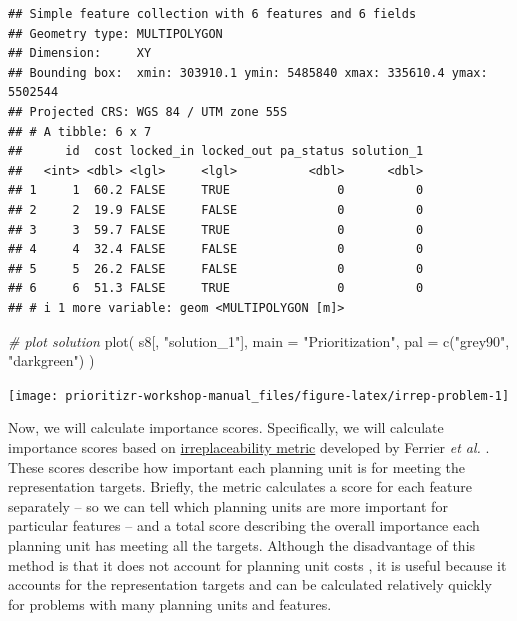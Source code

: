 \documentclass[
  12pt,
]{book}
\newenvironment{Shaded}{\begin{snugshade}}{\end{snugshade}}
\newcommand{\AttributeTok}[1]{\textcolor[rgb]{0.77,0.63,0.00}{#1}}
\newcommand{\CommentTok}[1]{\textcolor[rgb]{0.56,0.35,0.01}{\textit{#1}}}
\newcommand{\FunctionTok}[1]{\textcolor[rgb]{0.00,0.00,0.00}{#1}}
\newcommand{\NormalTok}[1]{#1}
\newcommand{\StringTok}[1]{\textcolor[rgb]{0.31,0.60,0.02}{#1}}
\begin{document}
\begin{verbatim}
## Simple feature collection with 6 features and 6 fields
## Geometry type: MULTIPOLYGON
## Dimension:     XY
## Bounding box:  xmin: 303910.1 ymin: 5485840 xmax: 335610.4 ymax: 5502544
## Projected CRS: WGS 84 / UTM zone 55S
## # A tibble: 6 x 7
##      id  cost locked_in locked_out pa_status solution_1
##   <int> <dbl> <lgl>     <lgl>          <dbl>      <dbl>
## 1     1  60.2 FALSE     TRUE               0          0
## 2     2  19.9 FALSE     FALSE              0          0
## 3     3  59.7 FALSE     TRUE               0          0
## 4     4  32.4 FALSE     FALSE              0          0
## 5     5  26.2 FALSE     FALSE              0          0
## 6     6  51.3 FALSE     TRUE               0          0
## # i 1 more variable: geom <MULTIPOLYGON [m]>
\end{verbatim}

\begin{Shaded}
\begin{Highlighting}[]
\CommentTok{\# plot solution}
\FunctionTok{plot}\NormalTok{(}
\NormalTok{  s8[, }\StringTok{"solution\_1"}\NormalTok{], }\AttributeTok{main =} \StringTok{"Prioritization"}\NormalTok{,}
  \AttributeTok{pal =} \FunctionTok{c}\NormalTok{(}\StringTok{"grey90"}\NormalTok{, }\StringTok{"darkgreen"}\NormalTok{)}
\NormalTok{)}
\end{Highlighting}
\end{Shaded}

\begin{center}\texttt{[image: prioritizr-workshop-manual\_files/figure-latex/irrep-problem-1]} \end{center}

Now, we will calculate importance scores. Specifically, we will calculate importance scores based on \href{https://prioritizr.net/reference/eval_ferrier_importance.html}{irreplaceability metric} developed by Ferrier \emph{et al.} \citeyearpar{r4}. These scores describe how important each planning unit is for meeting the representation targets. Briefly, the metric calculates a score for each feature separately -- so we can tell which planning units are more important for particular features -- and a total score describing the overall importance each planning unit has meeting all the targets. Although the disadvantage of this method is that it does not account for planning unit costs \citep[c.f., \href{https://prioritizr.net/reference/eval_replacement_importance.html}{the replacement cost metric},][]{r14}, it is useful because it accounts for the representation targets and can be calculated relatively quickly for problems with many planning units and features.
\end{document}
